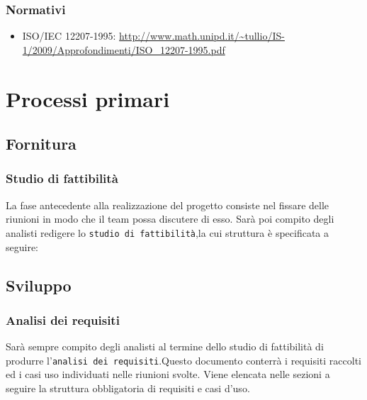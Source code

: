 		\subsubsection{Normativi}
		\begin{itemize}
		\item ISO/IEC 12207-1995: \url{http://www.math.unipd.it/\~tullio/IS-1/2009/Approfondimenti/ISO_12207-1995.pdf}
		\end{itemize}




\section{Processi primari}

\subsection{Fornitura}

	\subsubsection{Studio di fattibilità}
	La fase antecedente alla realizzazione del progetto consiste nel fissare delle riunioni in modo che il team possa discutere di esso. Sarà poi compito degli analisti redigere lo \texttt{studio di fattibilità},la cui struttura è specificata a seguire: %

\subsection{Sviluppo}
	\subsubsection{Analisi dei requisiti}
	Sarà sempre compito degli analisti al termine dello studio di fattibilità di produrre l'\texttt{analisi dei requisiti}.Questo documento conterrà i requisiti raccolti ed i casi uso individuati nelle riunioni svolte.
	Viene elencata nelle sezioni a seguire la struttura obbligatoria di requisiti e casi d'uso.

